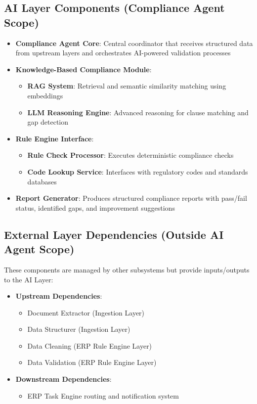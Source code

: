 \documentclass[12pt]{report}
\begin{document}
\subsection{AI Layer Components (Compliance Agent Scope)}
\begin{itemize}
  \item \textbf{Compliance Agent Core}: Central coordinator that receives structured data from upstream layers and orchestrates AI-powered validation processes
  \item \textbf{Knowledge-Based Compliance Module}:
    \begin{itemize}
      \item \textbf{RAG System}: Retrieval and semantic similarity matching using embeddings
      \item \textbf{LLM Reasoning Engine}: Advanced reasoning for clause matching and gap detection
    \end{itemize}
  \item \textbf{Rule Engine Interface}:
    \begin{itemize}
      \item \textbf{Rule Check Processor}: Executes deterministic compliance checks
      \item \textbf{Code Lookup Service}: Interfaces with regulatory codes and standards databases
    \end{itemize}
  \item \textbf{Report Generator}: Produces structured compliance reports with pass/fail status, identified gaps, and improvement suggestions
\end{itemize}

\subsection{External Layer Dependencies (Outside AI Agent Scope)}
These components are managed by other subsystems but provide inputs/outputs to the AI Layer:
\begin{itemize}
  \item \textbf{Upstream Dependencies}:
    \begin{itemize}
      \item Document Extractor (Ingestion Layer)
      \item Data Structurer (Ingestion Layer)
      \item Data Cleaning (ERP Rule Engine Layer)
      \item Data Validation (ERP Rule Engine Layer)
    \end{itemize}
  \item \textbf{Downstream Dependencies}:
    \begin{itemize}
      \item ERP Task Engine routing and notification system
    \end{itemize}
\end{itemize}
\end{document}
